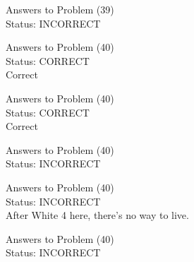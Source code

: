 \documentclass[11pt]{article}
\begin{document}
\begin{minipage}[t]{0.5\textwidth}
  {\centering
  
  Answers to Problem (39)\\
  Status: INCORRECT\\
  
  }
\end{minipage}
\begin{minipage}[t]{0.5\textwidth}
  {\centering
  
  Answers to Problem (40)\\
  Status: CORRECT\\
  Correct\\
  }
\end{minipage}
\begin{minipage}[t]{0.5\textwidth}
  {\centering
  
  Answers to Problem (40)\\
  Status: CORRECT\\
  Correct\\
  }
\end{minipage}
\begin{minipage}[t]{0.5\textwidth}
  {\centering
  
  Answers to Problem (40)\\
  Status: INCORRECT\\
  
  }
\end{minipage}
\begin{minipage}[t]{0.5\textwidth}
  {\centering
  
  Answers to Problem (40)\\
  Status: INCORRECT\\
  After White 4 here, there's no way to live.\\
  }
\end{minipage}
\begin{minipage}[t]{0.5\textwidth}
  {\centering
  
  Answers to Problem (40)\\
  Status: INCORRECT\\
  
  }
\end{minipage}
\end{document}
